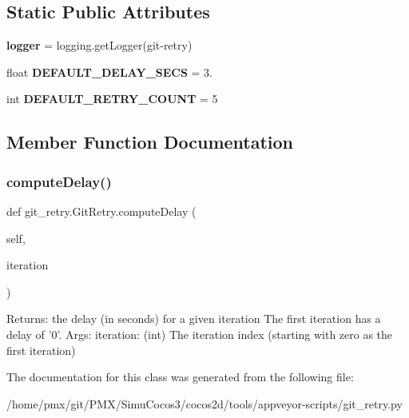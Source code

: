 \subsection*{Static Public Attributes}
\begin{DoxyCompactItemize}
\item 
\mbox{\label{classgit__retry_1_1GitRetry_a2d230b6a25ed3301618097291df7d86f}} 
{\bfseries logger} = logging.\+get\+Logger(\textquotesingle{}git-\/retry\textquotesingle{})
\item 
\mbox{\label{classgit__retry_1_1GitRetry_ab253647bbd9fdb29c3209cccbd37ce10}} 
float {\bfseries D\+E\+F\+A\+U\+L\+T\+\_\+\+D\+E\+L\+A\+Y\+\_\+\+S\+E\+CS} = 3.
\item 
\mbox{\label{classgit__retry_1_1GitRetry_a946b00f4cdb3f8a14849fc4be9ef6dd7}} 
int {\bfseries D\+E\+F\+A\+U\+L\+T\+\_\+\+R\+E\+T\+R\+Y\+\_\+\+C\+O\+U\+NT} = 5
\end{DoxyCompactItemize}


\subsection{Member Function Documentation}
\mbox{\label{classgit__retry_1_1GitRetry_a02c4f3a76f8056d3fb5641096edeab9f}} 
\subsubsection{\texorpdfstring{compute\+Delay()}{computeDelay()}}
{\footnotesize\ttfamily def git\+\_\+retry.\+Git\+Retry.\+compute\+Delay (\begin{DoxyParamCaption}\item[{}]{self,  }\item[{}]{iteration }\end{DoxyParamCaption})}

\begin{DoxyVerb}Returns: the delay (in seconds) for a given iteration
The first iteration has a delay of '0'.
Args:
  iteration: (int) The iteration index (starting with zero as the first
  iteration)
\end{DoxyVerb}
 

The documentation for this class was generated from the following file\+:\begin{DoxyCompactItemize}
\item 
/home/pmx/git/\+P\+M\+X/\+Simu\+Cocos3/cocos2d/tools/appveyor-\/scripts/git\+\_\+retry.\+py\end{DoxyCompactItemize}

